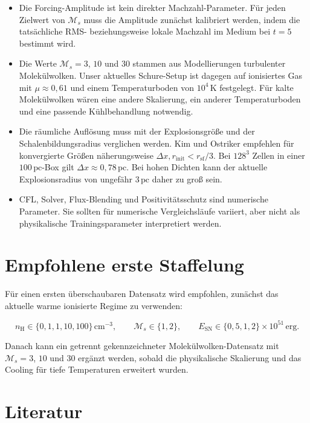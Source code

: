 \documentclass[11pt,a4paper]{article}
\begin{document}
\begin{itemize}
  \item Die Forcing-Amplitude ist kein direkter Machzahl-Parameter. Für jeden
    Zielwert von $\mathcal M_s$ muss die Amplitude zunächst kalibriert werden,
    indem die tatsächliche RMS- beziehungsweise lokale Machzahl im Medium bei
    $t=5$ bestimmt wird.
  \item Die Werte $\mathcal M_s=3$, $10$ und $30$ stammen aus Modellierungen
    turbulenter Molekülwolken. Unser aktuelles Schure-Setup ist dagegen auf
    ionisiertes Gas mit $\mu\approx0{,}61$ und einem Temperaturboden von
    $10^4\,\mathrm K$ festgelegt. Für kalte Molekülwolken wären eine andere
    Skalierung, ein anderer Temperaturboden und eine passende Kühlbehandlung
    notwendig.
  \item Die räumliche Auflösung muss mit der Explosionsgröße und der
    Schalenbildungsradius verglichen werden. Kim und Ostriker empfehlen für
    konvergierte Größen näherungsweise $\Delta x,r_{\mathrm{init}}<r_{\mathrm{sf}}/3$.
    Bei $128^3$ Zellen in einer $100\,\mathrm{pc}$-Box gilt
    $\Delta x\approx0{,}78\,\mathrm{pc}$. Bei hohen Dichten kann der aktuelle
    Explosionsradius von ungefähr $3\,\mathrm{pc}$ daher zu groß sein.
  \item CFL, Solver, Flux-Blending und Positivitätsschutz sind numerische
    Parameter. Sie sollten für numerische Vergleichsläufe variiert, aber nicht
    als physikalische Trainingsparameter interpretiert werden.
\end{itemize}

\section{Empfohlene erste Staffelung}

Für einen ersten überschaubaren Datensatz wird empfohlen, zunächst das aktuelle
warme ionisierte Regime zu verwenden:

\[
n_{\mathrm H}\in\{0{,}1,1,10,100\}\,\mathrm{cm}^{-3},\qquad
\mathcal M_s\in\{1,2\},\qquad
E_{\mathrm{SN}}\in\{0{,}5,1,2\}\times10^{51}\,\mathrm{erg}.
\]

Danach kann ein getrennt gekennzeichneter Molekülwolken-Datensatz mit
$\mathcal M_s=3$, $10$ und $30$ ergänzt werden, sobald die physikalische
Skalierung und das Cooling für tiefe Temperaturen erweitert wurden.

\section{Literatur}
\end{document}
